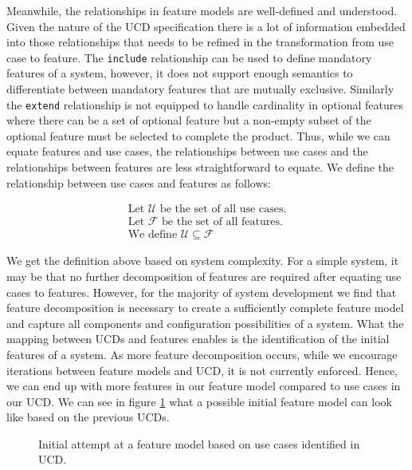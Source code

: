 Meanwhile, the relationships in feature models are well-defined and understood. Given the nature of the \ac{UCD} specification there is a lot of information embedded into those relationships that needs to be refined in the transformation from use case to feature. The \texttt{include} relationship can be used to define mandatory features of a system, however, it does not support enough semantics to differentiate between mandatory features that are mutually exclusive. Similarly the \texttt{extend} relationship is not equipped to handle cardinality in optional features where there can be a set of optional feature but a non-empty subset of the optional feature must be selected to complete the product. Thus, while we can equate features and use cases, the relationships between use cases and the relationships between features are less straightforward to equate. We define the relationship between use cases and features as follows:

\begin{gather}
\label{feat-req_hierarchy}
	\text{Let } \mathcal{U} \text{ be the set of all use cases.}\\
	\text{Let } \mathcal{F} \text{ be the set of all features.}\\
	\text{We define } \mathcal{U} \subseteq \mathcal{F} 
\end{gather}

We get the definition above based on system complexity. For a simple system, it may be that no further decomposition of features are required after equating use cases to features. However, for the majority of system development we find that feature decomposition is necessary to create a sufficiently complete feature model and capture all components and configuration possibilities of a system. What the mapping between \ac{UCD}s and features enables is the identification of the initial features of a system. As more feature decomposition occurs, while we encourage iterations between feature models and \ac{UCD}, it is not currently enforced. Hence, we can end up with more features in our feature model compared to use cases in our \ac{UCD}. We can see in figure \ref{fig:FM_init} what a possible initial feature model can look like based on the previous \ac{UCD}s.


\begin{figure}
	\centering
	
	\caption{Initial attempt at a feature model based on use cases identified in \ac{UCD}.}
	\label{fig:FM_init}
\end{figure}

